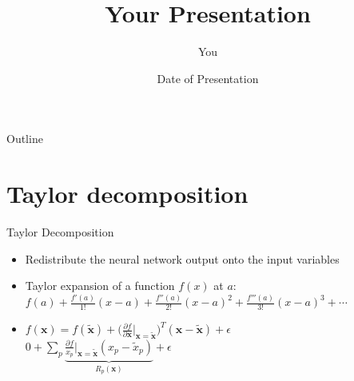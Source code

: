 \documentclass{beamer}
\title[Your Short Title]{Your Presentation}
\author{You}
\institute{Where You're From}
\date{Date of Presentation}
\begin{document}
\begin{frame}
  \titlepage
\end{frame}

\begin{frame}{Outline}
  \tableofcontents
\end{frame}

\section{Taylor decomposition}

\begin{frame}{Taylor Decomposition}

\begin{itemize}
  \item Redistribute the neural network output onto the input variables
  \item Taylor expansion of a function $f(x)$ at $a$: \\
  $f(a) + \frac{f'(a)}{1!}(x-a) + \frac{f''(a)}{2!}(x-a)^2 + \frac{f'''(a)}{3!}(x-a)^3 + \cdots$ \\
  \item $f(\mathbf{x}) = f(\tilde{\mathbf{x}}) + \big( \frac{\partial f}{\partial \mathbf{x}} \biggr\rvert_{\mathbf{x} = \tilde{\mathbf{x}}} \big)^T
  (\mathbf{x} - \tilde{\mathbf{x}}) + \epsilon $ \\
  $0 + \sum_p \underbrace{\frac{\partial f}{x_p} \biggr\rvert_{\mathbf{x} = \tilde{\mathbf{x}}} (x_p - \tilde{x}_p)}_\text{$R_p(\mathbf{x})$} + \epsilon  $ 
\end{itemize}

\end{frame}

\end{document}
